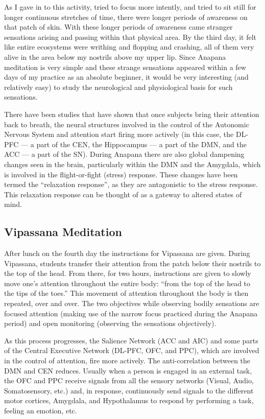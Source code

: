 \documentclass[a4paper, amsfonts, amssymb, amsmath, reprint, showkeys, nofootinbib, twoside]{revtex4-1}
\begin{document}
As I gave in to this activity, tried to focus more intently, and tried to sit still for
longer continuous stretches of time, there were longer periods of awareness on that
patch of skin. With these longer periods of awareness came
stranger sensations arising and passing within that physical area. By the third day,
it felt like entire ecosystems were writhing and flopping and crashing, all of them
very alive in the area below my nostrils above my upper lip. Since Anapana meditation
is very simple and these strange sensations appeared within a few days of my practice
as an absolute beginner, it would be very interesting (and relatively easy) to study
the neurological and physiological basis for such sensations.

There have been studies that have shown that once subjects bring their
attention back to breath, the neural structures involved in the control
of the Autonomic Nervous System and attention start firing more actively
(in this case, the DL-PFC --- a part of the CEN, the Hippocampus --- a part of the
DMN, and the ACC --- a part of the SN). During Anapana there are also global
dampening changes seen in the brain, particularly within the DMN and the Amygdala, which is involved in
the flight-or-fight (stress) response. These changes have been
termed the ``relaxation response'', as they are antagonistic to the stress
response. This relaxation response can be thought of as a gateway to altered states
of mind. \cite{relaxationresponse}

\subsection{Vipassana Meditation}

After lunch on the fourth day the instructions for Vipassana are given. During
Vipassana, students transfer their attention from the patch below their nostrils to the top
of the head. From there, for two hours, instructions are given to slowly move
one's attention throughout the entire body: ``from the top of the head to the tips of
the toes.'' This movement of attention throughout the body is then repeated, over and
over. The two objectives while observing bodily sensations are focused attention (making
use of the narrow focus practiced during the Anapana period) and open monitoring
(observing the sensations objectively).

As this process progresses, the Salience Network (ACC and AIC) and some parts of
the Central Executive Network (DL-PFC, OFC, and PPC),
which are involved in the control of attention, fire more actively. The anti-correlation
between the DMN and CEN reduces. Usually when a person is engaged in an external task,
the OFC and PPC receive signals from all the sensory networks (Visual, Audio, Somatosensory, etc.) and,
in response, continuously send signals to the different motor cortices, Amygdala, and Hypothalamus to
respond by performing a task, feeling an emotion, etc.
\end{document}

